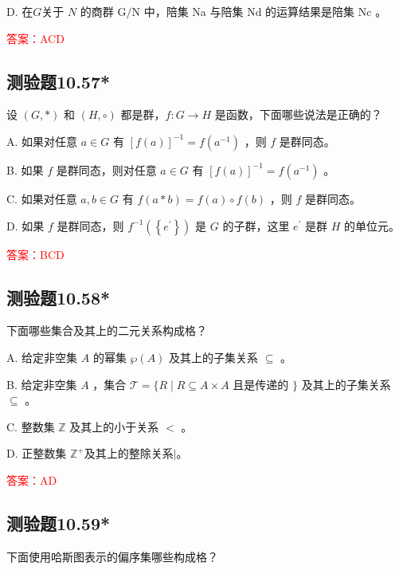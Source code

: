\documentclass[UTF8, heading=true]{ctexart}
\begin{document}
D. 在$G$关于 $N$ 的商群 $\mathrm{G} / \mathrm{N}$ 中，陪集 Na 与陪集 Nd 的运算结果是陪集 Nc 。

\textcolor{red}{答案：ACD}


\subsection{测验题10.57*}

设 $(G, *)$ 和 $(H, \circ)$ 都是群，$f: G \rightarrow H$ 是函数，下面哪些说法是正确的？

A. 如果对任意 $a \in G$ 有 $[f(a)]^{-1}=f\left(a^{-1}\right)$ ，则 $f$ 是群同态。

B. 如果 $f$ 是群同态，则对任意 $a \in G$ 有 $[f(a)]^{-1}=f\left(a^{-1}\right)$ 。

C. 如果对任意 $a, b \in G$ 有 $f(a * b)=f(a) \circ f(b)$ ，则 $f$ 是群同态。

D. 如果 $f$ 是群同态，则 $f^{-1}\left(\left\{e^{\prime}\right\}\right)$ 是 $G$ 的子群，这里 $e^{\prime}$ 是群 $H$ 的单位元。

\textcolor{red}{答案：BCD}

\subsection{测验题10.58*}

下面哪些集合及其上的二元关系构成格？

A. 给定非空集 $A$ 的幂集 $\wp(A)$ 及其上的子集关系 $\subseteq$ 。

B. 给定非空集 $A$ ，集合 $\mathcal{T}=\{R \mid R \subseteq A \times A$ 且是传递的 $\}$ 及其上的子集关系 $\subseteq$ 。

C. 整数集 $\mathbb{Z}$ 及其上的小于关系 $<$ 。

D. 正整数集 $\mathbb{Z}^{+}$及其上的整除关系$\mid$。

\textcolor{red}{答案：AD}

\subsection{测验题10.59*}

下面使用哈斯图表示的偏序集哪些构成格？
\end{document}
